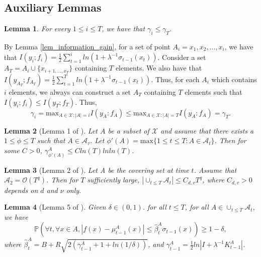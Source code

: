 \documentclass[twoside]{article}
\newtheorem{lemma}{Lemma}
\newenvironment{proof*}[1][\proofname]{
  \renewcommand\qedsymbol{\rule{2.5mm}{2.5mm}}
  \begin{proof}[#1]}{\end{proof}}
\begin{document}
\subsection{Auxiliary Lemmas}
\begin{lemma}
For every $1 \le i  \le T$, we have that $\gamma_i \le \gamma_T$. \label{lem_gamma}
\end{lemma}
\begin{proof*}
By Lemma \ref{lem_information_gain}, for a set of point $A_i = {x_1 ,x_2, ..., x_i}$, we have that $I(y_i;f_i) = \frac{1}{2}\sum_{t=1}^{i} ln(1 + \lambda^{-1} \sigma_{t-1}(x_t))$. Consider a set $A_T = A_i \cup \{x_{i+1, ..., x_T}\}$ containing $T$ elements. We also have that $I(y_{A_T};f_{A_T}) = \frac{1}{2}\sum_{t=1}^{T} ln(1 + \lambda^{-1} \sigma_{t-1}(x_t))$. Thus, for each $A_i$ which contains $i$ elements, we always can construct a set $A_T$ containing $T$ elements such that $I(y_i;f_i) \le I(y_T;f_T)$.
Thus, $$\gamma_i = \text{max}_{A \in \mathcal X: |A| = i} I(y_A: f_A) \le \text{max}_{A \in \mathcal X: |A| = T} I(y_A: f_A) = \gamma_T.$$
\end{proof*}
\begin{lemma}[Lemma 1 of \citep{janz20a}]
Let $A$ be a subset of $\mathcal X$ and assume that there exists a $1 \le \phi \le T$ such that $A \in \mathcal A_{\tau}$. Let $\phi'(A) = \text{max}\{1 \le t \le T: A \in \mathcal A_t\}$. Then for some $C > 0$, $\gamma_{\phi'(A)}^A \le Cln(T)lnln(T)$.
\label{lem_gain_new}
\end{lemma}
\begin{lemma}[Lemma 2 of \citep{janz20a}]
Let A be the covering set at time $t$. Assume that $\mathcal A_2 = \mathcal O(T^q)$. Then for $T$ sufficiently large, $|\cup_{t \le T} \mathcal A_t| \le C_{d,v} T^q$, where $C_{d,v} > 0$ depends on $d$ and $\nu$ only.
\label{lem3.6}
\end{lemma}

\begin{lemma}[Lemma 5 of \citep{janz20a}]
Given $\delta \in (0,1)$. for all $t \le T$, for all $A \in \cup_{t \le T} \mathcal A_t$, we have
$$\mathbb{P}(\forall t, \forall x \in A, |f(x) - \mu^A_{t-1}(x)| \le \hat{\beta}^A_t \sigma_{t-1}(x) ) \ge 1 - \delta,$$
where $\hat{\beta}^A_t = B + R \sqrt{2(\gamma^A_{t-1} + 1 + ln(1/\delta))}$, and $\gamma^A_{t-1} = \frac{1}{2} ln|I + \lambda^{-1}K^A_{t-1}|$.
\label{le_beta_new}
\end{lemma}
\end{document}
